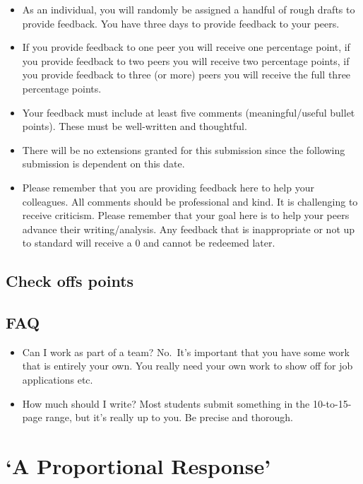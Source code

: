 \documentclass[
]{book}
\providecommand{\tightlist}{%
  \setlength{\itemsep}{0pt}\setlength{\parskip}{0pt}}
\begin{document}
\begin{itemize}
\tightlist
\item
  As an individual, you will randomly be assigned a handful of rough drafts to provide feedback. You have three days to provide feedback to your peers.
\item
  If you provide feedback to one peer you will receive one percentage point, if you provide feedback to two peers you will receive two percentage points, if you provide feedback to three (or more) peers you will receive the full three percentage points.
\item
  Your feedback must include at least five comments (meaningful/useful bullet points). These must be well-written and thoughtful.
\item
  There will be no extensions granted for this submission since the following submission is dependent on this date.
\item
  Please remember that you are providing feedback here to help your colleagues. All comments should be professional and kind. It is challenging to receive criticism. Please remember that your goal here is to help your peers advance their writing/analysis. Any feedback that is inappropriate or not up to standard will receive a 0 and cannot be redeemed later.
\end{itemize}

\hypertarget{check-offs-points-3}{%
\subsection{Check offs points}\label{check-offs-points-3}}

\hypertarget{faq-3}{%
\subsection{FAQ}\label{faq-3}}

\begin{itemize}
\tightlist
\item
  Can I work as part of a team? No.~It's important that you have some work that is entirely your own. You really need your own work to show off for job applications etc.
\item
  How much should I write? Most students submit something in the 10-to-15-page range, but it's really up to you. Be precise and thorough.
\end{itemize}

\hypertarget{a-proportional-response}{%
\section{`A Proportional Response'}\label{a-proportional-response}}
\end{document}
